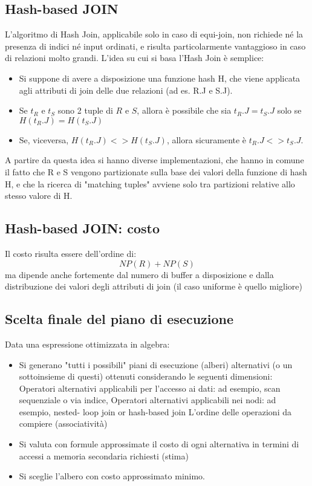 \documentclass[a4paper, 10pt]{article}
\theoremstyle{definition}
\begin{document}
	\subsection*{Hash-based JOIN}
		L'algoritmo di Hash Join, applicabile solo in caso di
		equi-join, non richiede né la presenza di indici né
		input ordinati, e risulta particolarmente vantaggioso in
		caso di relazioni molto grandi. L'idea su cui si basa
		l'Hash Join è semplice:
		\begin{itemize}
			\item Si suppone di avere a disposizione una funzione hash H,
			che viene applicata agli attributi di join delle due relazioni
			(ad es. R.J e S.J).
			\item Se $ t_R $ e $ t_S $ sono 2 tuple di $ R $ e $ S $, allora è possibile che sia
			$ t_R.J = t_S.J $ solo se $ H(t_R.J) = H(t_S.J) $
			\item Se, viceversa, $ H(t_R.J) <> H(t_S.J) $, allora sicuramente è
			$ t_R.J <> t_S.J $.
		\end{itemize}
		A partire da questa idea si hanno diverse
		implementazioni, che hanno in comune il fatto che R
		e S vengono partizionate sulla base dei valori della
		funzione di hash H, e che la ricerca di "matching
		tuples" avviene solo tra partizioni relative allo stesso
		valore di H.
		
	\subsection*{Hash-based JOIN: costo}
		Il costo risulta essere dell'ordine di:
		\[
			NP(R) + NP(S)			
		\]
		\noindent
		ma dipende anche fortemente dal numero di buffer a
		disposizione e dalla distribuzione dei valori degli
		attributi di join (il caso uniforme è quello migliore)
		
	\subsection{Scelta finale del piano di esecuzione}
		Data una espressione ottimizzata in algebra:
		\begin{itemize}
			\item Si generano "tutti i possibili" piani di esecuzione
			(alberi) alternativi (o un sottoinsieme di questi)
			ottenuti considerando le seguenti dimensioni:
				\subitem{-} Operatori alternativi applicabili per l'accesso ai dati: ad
				esempio, scan sequenziale o via indice,
				\subitem{-} Operatori alternativi applicabili nei nodi: ad esempio, nested-
				loop join or hash-based join
				\subitem{-} L'ordine delle operazioni da compiere (associatività)
			\item Si valuta con formule approssimate il costo di ogni
			alternativa in termini di accessi a memoria
			secondaria richiesti (stima)
			\item Si sceglie l'albero con costo approssimato minimo.
		\end{itemize}
		
\end{document}
